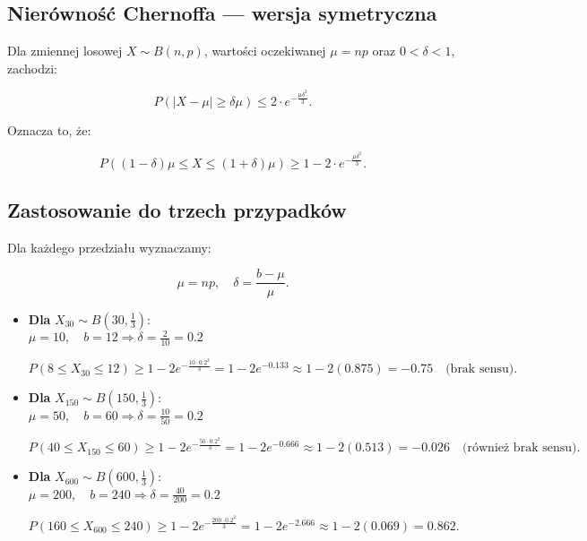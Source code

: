 \documentclass{article}
\begin{document}
\subsection*{Nierówność Chernoffa — wersja symetryczna}

Dla zmiennej losowej \( X \sim B(n, p) \), wartości oczekiwanej \( \mu = np \) oraz \( 0 < \delta < 1 \), zachodzi:

\[
P(|X - \mu| \geq \delta \mu) \leq 2 \cdot e^{- \frac{\mu \delta^2}{3}}.
\]

Oznacza to, że:

\[
P((1 - \delta)\mu \leq X \leq (1 + \delta)\mu) \geq 1 - 2 \cdot e^{- \frac{\mu \delta^2}{3}}.
\]

\subsection*{Zastosowanie do trzech przypadków}

Dla każdego przedziału wyznaczamy:

\[
\mu = np, \quad \delta = \frac{b - \mu}{\mu}.
\]

\begin{itemize}
    \item \textbf{Dla} \( X_{30} \sim B(30, \frac{1}{3}) \): \\
    \( \mu = 10, \quad b = 12 \Rightarrow \delta = \frac{2}{10} = 0.2 \)

    \[
    P(8 \leq X_{30} \leq 12) \geq 1 - 2e^{- \frac{10 \cdot 0.2^2}{3}} = 1 - 2e^{-0.133} \approx 1 - 2(0.875) = -0.75 \quad \text{(brak sensu)}.
    \]

    \item \textbf{Dla} \( X_{150} \sim B(150, \frac{1}{3}) \): \\
    \( \mu = 50, \quad b = 60 \Rightarrow \delta = \frac{10}{50} = 0.2 \)

    \[
    P(40 \leq X_{150} \leq 60) \geq 1 - 2e^{- \frac{50 \cdot 0.2^2}{3}} = 1 - 2e^{-0.666} \approx 1 - 2(0.513) = -0.026 \quad \text{(również brak sensu)}.
    \]

    \item \textbf{Dla} \( X_{600} \sim B(600, \frac{1}{3}) \): \\
    \( \mu = 200, \quad b = 240 \Rightarrow \delta = \frac{40}{200} = 0.2 \)

    \[
    P(160 \leq X_{600} \leq 240) \geq 1 - 2e^{- \frac{200 \cdot 0.2^2}{3}} = 1 - 2e^{-2.666} \approx 1 - 2(0.069) = 0.862.
    \]
\end{itemize}
\end{document}
